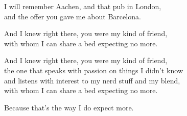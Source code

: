 \begin{lyrics}
I will remember Aachen, and that pub in London,\\
and the offer you gave me about Barcelona.

And I knew right there, you were my kind of friend,\\
with whom I can share a bed expecting no more.

And I knew right there, you were my kind of friend,\\
the one that speaks with passion on things I didn’t know\\
and listens with interest to my nerd stuff and my blend,\\
with whom I can share a bed expecting no more.

Because that’s the way I do expect more.
\end{lyrics}

